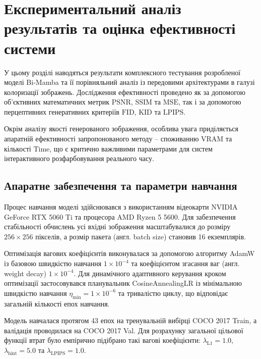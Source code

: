 
\chapter{Експериментальний аналіз результатів та оцінка ефективності системи}
    \label{chap:results}

    У цьому розділі наводяться результати комплексного тестування розробленої моделі Bi-Mamba та її порівняльний аналіз із передовими архітектурами в галузі колоризації зображень.
    Дослідження ефективності проведено як за допомогою об'єктивних математичних метрик $\mathrm{PSNR}$, $\mathrm{SSIM}$ та $\mathrm{MSE}$,
    так і за допомогою перцептивних генеративних критеріїв $\mathrm{FID}$, $\mathrm{KID}$ та $\mathrm{LPIPS}$. 

    Окрім аналізу якості генерованого зображення, особлива увага приділяється апаратній ефективності запропонованого методу -- споживанню $\mathrm{VRAM}$ та кількості $\mathrm{Time}$,
    що є критично важливими параметрами для систем інтерактивного розфарбовування реального часу.

    \section{Апаратне забезпечення та параметри навчання}
        Процес навчання моделі здійснювався з використанням відеокарти NVIDIA GeForce RTX 5060 Ti та процесора AMD Ryzen 5 5600.
        Для забезпечення стабільності обчислень усі вхідні зображення масштабувалися до розміру $256 \times 256$ пікселів, а розмір пакета (англ. batch size) становив 16 екземплярів.
        
        Оптимізація вагових коефіцієнтів виконувалася за допомогою алгоритму AdamW із базовою швидкістю навчання $1 \times 10^{-4}$ та коефіцієнтом згасання ваг (англ. weight decay) $1 \times 10^{-4}$.
        Для динамічного адаптивного керування кроком оптимізації застосовувався планувальник CosineAnnealingLR із мінімальною швидкістю навчання $\eta_{\min} = 1 \times 10^{-6}$
        та тривалістю циклу, що відповідає загальній кількості епох навчання.
        
        Модель навчалася протягом 43 епох на тренувальній вибірці COCO 2017 Train, а валідація проводилася на COCO 2017 Val.
        Для розрахунку загальної цільової функції втрат було емпірично підібрано такі вагові коефіцієнти: $\lambda_{\mathrm{L1}} = 1.0$, $\lambda_{\mathrm{hint}} = 5.0$ та $\lambda_{\mathrm{LPIPS}} = 1.0$. 
        
